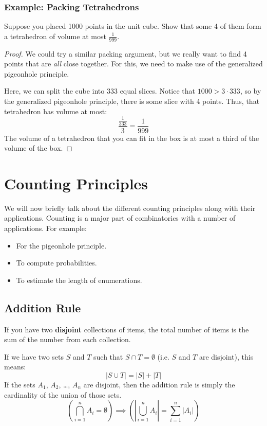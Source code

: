 \documentclass[letterpaper]{article}
\begin{document}
\subsubsection{Example: Packing Tetrahedrons}
Suppose you placed 1000 points in the unit cube. Show that some 4 of them form a tetrahedron of volume at most $\frac{1}{999}$.

\begin{proof}
    We could try a similar packing argument, but we really want to find 4 points that are \emph{all} close together. For this, we need to make use of the generalized pigeonhole principle.

    \bigskip 

    Here, we can split the cube into 333 equal slices. Notice that $1000 > 3 \cdot 333$, so by the generalized pigeonhole principle, there is some slice with 4 points. Thus, that tetrahedron has volume at most:
    \[\frac{\frac{1}{333}}{3} = \frac{1}{999}\]
    The volume of a tetrahedron that you can fit in the box is at most a third of the volume of the box. 
\end{proof}


\newpage 
\section{Counting Principles}
We will now briefly talk about the different counting principles along with their applications. Counting is a major part of combinatorics with a number of applications. For example:
\begin{itemize}
    \item For the pigeonhole principle.
    \item To compute probabilities. 
    \item To estimate the length of enumerations. 
\end{itemize}


\subsection{Addition Rule}
If you have two \textbf{disjoint} collections of items, the total number of items is the sum of the number from each collection.

\bigskip 

If we have two sets $S$ and $T$ such that $S \cap T = \emptyset$ (i.e. $S$ and $T$ are disjoint), this means:
\[|S \cup T| = |S| + |T|\]
If the sets $A_1$, $A_2$, \dots, $A_n$ are disjoint, then the addition rule is simply the cardinality of the union of those sets. 
\[\left(\bigcap_{i = 1}^n A_i = \emptyset\right) \implies \left(\left| \bigcup_{i = 1}^n A_i \right| = \sum_{i = 1}^n |A_i|\right)\]
\end{document}
